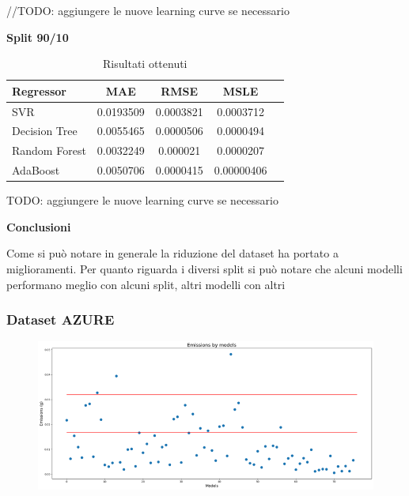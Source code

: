 //TODO: aggiungere le nuove learning curve se necessario



\textbf{Split 90/10}

\begin{table}[H]
    \centering
    \begin{tabular}{|>{\centering\arraybackslash}m{5cm}|c|c|c|c|}
        \hline
        \textbf{Regressor} & \textbf{MAE} & \textbf{RMSE} & \textbf{MSLE} \\ [10pt]
        \hline
        SVR & 0.0193509 & 0.0003821 & 0.0003712 \\ [10pt]
        \hline
        Decision Tree & 0.0055465 & 0.0000506 & 0.0000494 \\ [10pt]
        \hline
        Random Forest & 0.0032249 & 0.000021 & 0.0000207 \\ [10pt]
        \hline
        AdaBoost & 0.0050706 & 0.0000415 & 0.00000406 \\ [10pt]
        \hline
    \end{tabular}
    \caption*{Risultati ottenuti}
    \label{tab:results}
\end{table}


TODO: aggiungere le nuove learning curve se necessario



\textbf{Conclusioni}

Come si può notare in generale la riduzione del dataset ha portato a miglioramenti. Per quanto riguarda i diversi split si può notare che alcuni modelli performano meglio con alcuni split, altri modelli con altri


\subsubsection{Dataset AZURE}

\begin{figure}[H]
    \centering
    \includegraphics[scale=1.25]{images/nuova-situazione2-ridotto.png}
\end{figure}